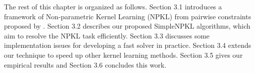 The rest of this chapter is organized as follows. Section 3.1 introduces a framework of Non-parametric Kernel Learning (NPKL) from pairwise constraints proposed by \cite{icml/HoiJL07}. Section 3.2 describes our proposed SimpleNPKL algorithms, which aim to resolve the NPKL task efficiently. Section 3.3 discusses some implementation issues for developing a fast solver in practice. Section 3.4 extends our technique to speed up other kernel learning methods. Section 3.5 gives our empirical results and Section 3.6 concludes this work.

%
%
%
